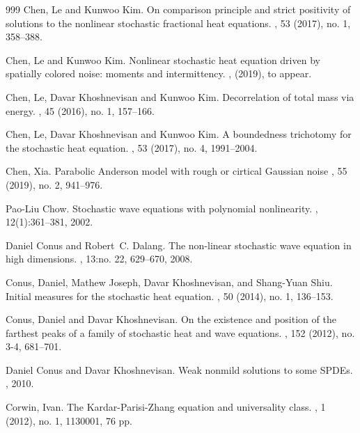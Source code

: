 \documentclass[a4paper,12pt]{article}
\theoremstyle{plain}
\theoremstyle{definition}
\begin{document}
\begin{thebibliography}{999}
Chen, Le  and Kunwoo Kim.
\newblock On comparison principle and strict positivity of solutions to the
nonlinear stochastic fractional heat equations.
, 53 (2017), no. 1, 358--388. 

Chen, Le and Kunwoo Kim.
\newblock Nonlinear stochastic heat equation driven by spatially colored noise:
moments and intermittency.
, (2019), to appear.


Chen, Le, Davar Khoshnevisan and Kunwoo Kim.
\newblock Decorrelation of total mass via energy.
, 45 (2016), no. 1, 157--166.

Chen, Le, Davar Khoshnevisan and Kunwoo Kim.
\newblock A boundedness trichotomy for the stochastic heat equation.
, 53 (2017), no. 4, 1991--2004. 

Chen, Xia.
\newblock Parabolic Anderson model with rough or cirtical Gaussian noise
, 55 (2019), no. 2, 941--976.

% 
Pao-Liu Chow.
\newblock Stochastic wave equations with polynomial nonlinearity.
, 12(1):361--381, 2002.

Daniel Conus and Robert~C. Dalang.
\newblock The non-linear stochastic wave equation in high dimensions.
, 13:no. 22, 629--670, 2008.


Conus, Daniel, Mathew Joseph, Davar Khoshnevisan, and Shang-Yuan Shiu.
\newblock Initial measures for the stochastic heat equation.
, 50 (2014), no. 1, 136--153.

Conus, Daniel and Davar Khoshnevisan.
\newblock On the existence and position of the farthest peaks of a family of stochastic heat and wave equations.
, 152 (2012), no. 3-4, 681--701.


Daniel Conus and Davar Khoshnevisan.
\newblock Weak nonmild solutions to some {SPDEs}.
, 2010.


Corwin, Ivan.
\newblock The Kardar-Parisi-Zhang equation and universality class. 
, 1 (2012), no. 1, 1130001, 76 pp.


\end{thebibliography}
\end{document}
